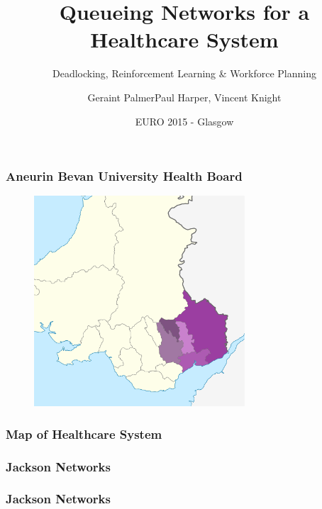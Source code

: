 \documentclass{beamer}
\title
{Queueing Networks for a Healthcare System}
\subtitle
{Deadlocking, Reinforcement Learning \& Workforce Planning}
\author{Geraint Palmer\newline \scriptsize{Paul Harper, Vincent Knight}}
\date{EURO 2015 - Glasgow}
\begin{document}
\frame{\titlepage}


\begin{frame}
\frametitle{Aneurin Bevan University Health Board}
\begin{figure}
\includegraphics[width=0.7\textwidth]{Aneurin_Bevan}
\end{figure}
\end{frame}

\begin{frame}
\frametitle{Map of Healthcare System}
\begin{figure}

\end{figure}
\end{frame}

\begin{frame}
    
\end{frame}

\begin{frame}
    
\end{frame}



\begin{frame}
  \frametitle{Jackson Networks}
  \begin{figure}
  
  \end{figure}
\end{frame}
\begin{frame}
  \frametitle{Jackson Networks}
  \begin{figure}
  
  \end{figure}
\end{frame}
\end{document}
